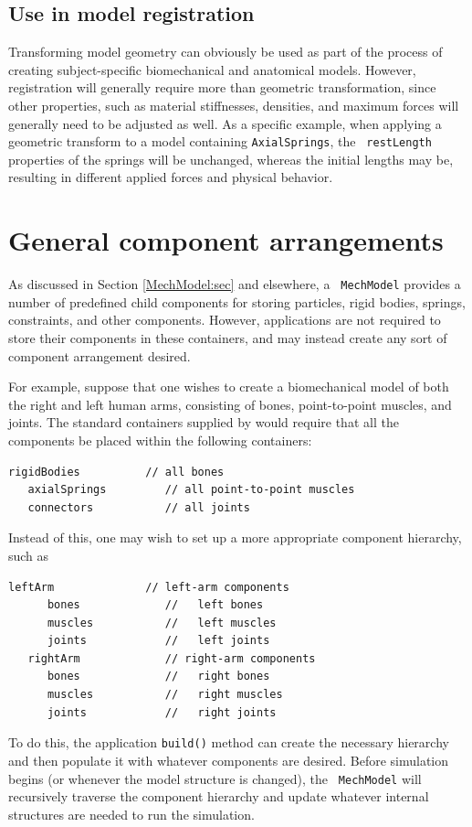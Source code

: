 \subsection{Use in model registration}

Transforming model geometry can obviously be used as part of the
process of creating subject-specific biomechanical and anatomical
models. However, registration will generally require more than
geometric transformation, since other properties, such as material
stiffnesses, densities, and maximum forces will generally need to be
adjusted as well. As a specific example, when applying a geometric
transform to a model containing {\tt AxialSprings}, the {\tt
restLength} properties of the springs will be unchanged, whereas the
initial lengths may be, resulting in different applied forces and
physical behavior.

\section{General component arrangements}
\label{GeneralComponentArrangements:sec}

As discussed in Section \ref{MechModel:sec} and elsewhere, a {\tt
MechModel} provides a number of predefined child components for
storing particles, rigid bodies, springs, constraints, and other
components.  However, applications are not required to store their
components in these containers, and may instead create any sort of
component arrangement desired.

For example, suppose that one wishes to create a biomechanical model
of both the right and left human arms, consisting of bones,
point-to-point muscles, and joints. The standard containers supplied
by  would require that
all the components be placed within the following containers:
%
\begin{lstlisting}[]
   rigidBodies          // all bones
   axialSprings         // all point-to-point muscles
   connectors           // all joints
\end{lstlisting}
%
Instead of this, one may wish to set up a more appropriate component
hierarchy, such as
%
\begin{lstlisting}[]
   leftArm              // left-arm components
      bones             //   left bones
      muscles           //   left muscles
      joints            //   left joints
   rightArm             // right-arm components
      bones             //   right bones
      muscles           //   right muscles
      joints            //   right joints
\end{lstlisting}
%
To do this, the application {\tt build()} method can create the
necessary hierarchy and then
populate it with whatever components are desired.  Before simulation
begins (or whenever the model structure is changed), the {\tt
MechModel} will recursively traverse the component hierarchy and
update whatever internal structures are needed to run the
simulation.


